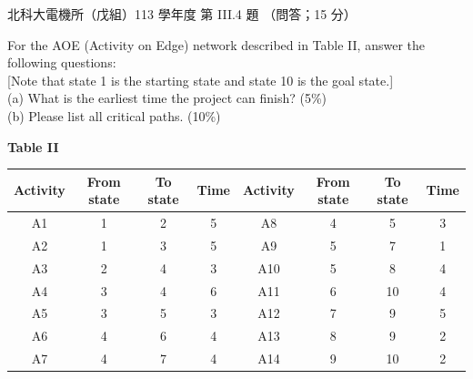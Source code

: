 \begin{pastexam}[label={px:ntut-113-ee-ds-13}]{北科大電機所（戊組）113 學年度 第 III.4 題}
（問答；15 分）

For the AOE (Activity on Edge) network described in Table II, answer the following questions:\\
{[}Note that state 1 is the starting state and state 10 is the goal state.{]}\\
(a) What is the earliest time the project can finish? (5\%)\\
(b) Please list all critical paths. (10\%)

\begin{center}
\textbf{Table II}\\
\small\setlength{\tabcolsep}{4pt}\begin{tabular}{|c|c|c|c||c|c|c|c|}\hline
\textbf{Activity} & \textbf{From state} & \textbf{To state} & \textbf{Time} & \textbf{Activity} & \textbf{From state} & \textbf{To state} & \textbf{Time}\\\hline
A1 & 1 & 2 & 5 & A8 & 4 & 5 & 3\\\hline
A2 & 1 & 3 & 5 & A9 & 5 & 7 & 1\\\hline
A3 & 2 & 4 & 3 & A10 & 5 & 8 & 4\\\hline
A4 & 3 & 4 & 6 & A11 & 6 & 10 & 4\\\hline
A5 & 3 & 5 & 3 & A12 & 7 & 9 & 5\\\hline
A6 & 4 & 6 & 4 & A13 & 8 & 9 & 2\\\hline
A7 & 4 & 7 & 4 & A14 & 9 & 10 & 2\\\hline
\end{tabular}
\end{center}
\end{pastexam}

